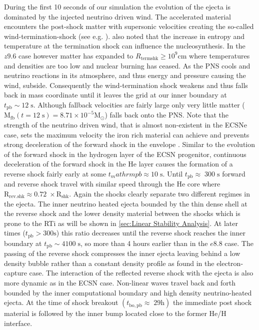 \documentclass[fleqn,usenatbib]{mnras}
\begin{document}
During the first 10 seconds of our simulation the evolution of the ejecta is dominated by the injected neutrino driven wind. The accelerated material encounters the post-shock matter with supersonic velocities creating the so-called wind-termination-shock (see e.g. \citet{Arcones2006}). \citet{Arcones2006} also noted that the increase in entropy and temperature at the termination shock can influence the nucleosynthesis. In the $z9.6$ case however matter has expanded to  $R_{\mathrm{term shk}} \geq 10^{9}\mathrm{cm}$ where temperatures and densities are too low and nuclear burning has ceased. 
As the PNS cools and neutrino reactions in its atmosphere, and thus energy and pressure causing the wind, subside. Consequently the wind-termination shock weakens and thus falls back in mass coordinate until it leaves the grid at our inner boundary at $t_{\mathrm{pb}}\sim 12\;\mathrm{s}$. Although fallback velocities are fairly large only very little matter ($\mathrm{M_{fb}}(t=12\;\mathrm{s})=8.71\times 10^{-5}\mathrm{M_{\odot}}$) falls back onto the PNS. Note that the strength of the neutrino driven wind, that is almost non-existent in the ECSNe case, sets the maximum velocity the iron rich material can achieve and prevents strong deceleration of the forward shock in the envelope \citep{Wongwathanarat2015}. 
Similar to the evolution of the forward shock in the hydrogen layer of the ECSN progenitor, continuous deceleration of the forward shock in the He layer causes the formation of a reverse shock fairly early at some $t_mathrm{pb}\approx 10\;\mathrm{s}$. Until $t_{\mathrm{pb}}\approx \; 300\;\mathrm{s}$ forward and reverse shock travel with similar speed through the He core where $\mathrm{R_{rev.shk}\approx 0.72\;\times R_{shk}}$. 
Again the shocks clearly separate two different regimes in the ejecta. The inner neutrino heated ejecta bounded by the thin dense shell at the reverse shock and the lower density material between the shocks which is prone to the RTi as will be shown in \autoref{sec:Linear Stability Analysis}. %
At later times ($t_{\mathrm{pb}} > 300 \mathrm{s}$) this ratio decreases until the reverse shock reaches the inner boundary at $t_{\mathrm{pb}}\sim 4100\;\mathrm{s}$, so more than 4 hours earlier than in the $e8.8$ case. The passing of the reverse shock compresses the inner ejecta leaving behind a low density bubble rather than a constant density profile as found in the electron-capture case.
The interaction of the reflected reverse shock with the ejecta is also more dynamic as in the ECSN case. Non-linear waves travel back and forth bounded by the inner computational boundary and high density neutrino-heated ejecta. At the time of shock breakout $(t_{\mathrm{bo,pb}}\approx\; 29\mathrm{h})$ the immediate post shock material is followed by the inner bump located close to the former He/H interface. %
\end{document}
